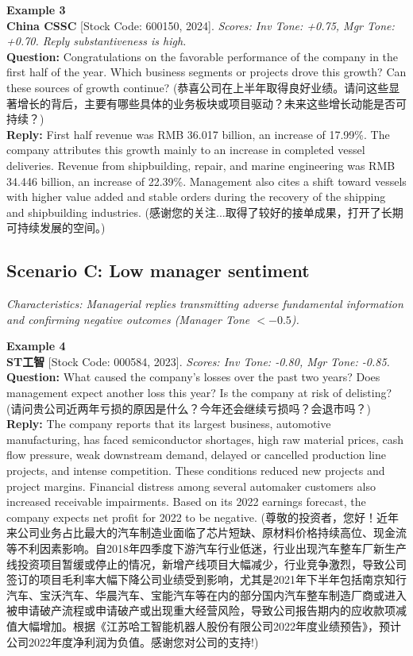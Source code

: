 \documentclass[12pt]{article}
\begin{document}
\vspace{0.3cm}
\noindent \textbf{Example 3} \\
\textbf{China CSSC} [Stock Code: 600150, 2024]. \textit{Scores: Inv Tone: +0.75, Mgr Tone: +0.70. Reply substantiveness is high.} \\
\textbf{Question:} Congratulations on the favorable performance of the company in the first half of the year. Which business segments or projects drove this growth? Can these sources of growth continue? (恭喜公司在上半年取得良好业绩。请问这些显著增长的背后，主要有哪些具体的业务板块或项目驱动？未来这些增长动能是否可持续？) \\
\textbf{Reply:} First half revenue was RMB 36.017 billion, an increase of 17.99\%. The company attributes this growth mainly to an increase in completed vessel deliveries. Revenue from shipbuilding, repair, and marine engineering was RMB 34.446 billion, an increase of 22.39\%. Management also cites a shift toward vessels with higher value added and stable orders during the recovery of the shipping and shipbuilding industries. (感谢您的关注...取得了较好的接单成果，打开了长期可持续发展的空间。)
\vspace{0.6cm}

\subsection{Scenario C: Low manager sentiment}
\textit{Characteristics: Managerial replies transmitting adverse fundamental information and confirming negative outcomes (Manager Tone $< -0.5$).}

\vspace{0.3cm}
\noindent \textbf{Example 4} \\
\textbf{ST工智} [Stock Code: 000584, 2023]. \textit{Scores: Inv Tone: -0.80, Mgr Tone: -0.85.} \\
\textbf{Question:} What caused the company's losses over the past two years? Does management expect another loss this year? Is the company at risk of delisting? (请问贵公司近两年亏损的原因是什么？今年还会继续亏损吗？会退市吗？) \\
\textbf{Reply:} The company reports that its largest business, automotive manufacturing, has faced semiconductor shortages, high raw material prices, cash flow pressure, weak downstream demand, delayed or cancelled production line projects, and intense competition. These conditions reduced new projects and project margins. Financial distress among several automaker customers also increased receivable impairments. Based on its 2022 earnings forecast, the company expects net profit for 2022 to be negative. (尊敬的投资者，您好！近年来公司业务占比最大的汽车制造业面临了芯片短缺、原材料价格持续高位、现金流等不利因素影响。自2018年四季度下游汽车行业低迷，行业出现汽车整车厂新生产线投资项目暂缓或停止的情况，新增产线项目大幅减少，行业竞争激烈，导致公司签订的项目毛利率大幅下降公司业绩受到影响，尤其是2021年下半年包括南京知行汽车、宝沃汽车、华晨汽车、宝能汽车等在内的部分国内汽车整车制造厂商或进入被申请破产流程或申请破产或出现重大经营风险，导致公司报告期内的应收款项减值大幅增加。根据《江苏哈工智能机器人股份有限公司2022年度业绩预告》，预计公司2022年度净利润为负值。感谢您对公司的支持!)
\vspace{0.6cm}
\end{document}
